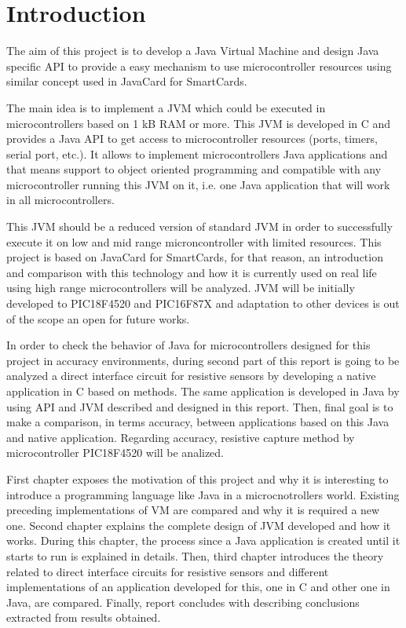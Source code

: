 \chapter{Introduction}\label{C:Introduction}
The aim of this project is to develop a Java Virtual Machine and design Java specific API to provide a easy mechanism to use microcontroller resources using similar concept used in JavaCard for SmartCards.

The main idea is to implement a JVM which could be executed in microcontrollers based on 1 kB RAM or more. This JVM is developed in C and provides a Java API to get access to microcontroller resources (ports, timers, serial port, etc.). It allows to implement microcontrollers Java applications and that means support to object oriented programming and compatible with any microcontroller running this JVM on it, i.e. one Java application that will work in all microcontrollers.

This JVM should be a reduced version of standard JVM in order to successfully execute it on low and mid range microncontroller with limited resources. This project is based on JavaCard for SmartCards, for that reason, an introduction and comparison with this technology and how it is currently used on real life using high range microcontrollers will be analyzed. JVM will be initially developed to PIC18F4520 and PIC16F87X and adaptation to other devices is out of the scope an open for future works.

In order to check the behavior of Java for microcontrollers designed for this project in accuracy environments, during second part of this report is going to be analyzed a direct interface circuit for resistive sensors by developing a native application in C based on \cite{Art:Accuracy} methods. The same application is developed in Java by using API and JVM described and designed in this report. Then, final goal is to make a comparison, in terms accuracy, between applications based on this Java and native application. Regarding accuracy, resistive capture method by microcontroller PIC18F4520  will be analized.

First chapter exposes the motivation of this project and why it is interesting to introduce a programming language like Java in a microcnotrollers world. Existing preceding implementations of VM are compared and why it is required a new one. Second chapter explains the complete design of JVM developed and how it works. During this chapter, the process since a Java application is created until it starts to run is explained in details. Then, third chapter introduces the theory related to direct interface circuits for resistive sensors and different implementations of an application developed for this, one in C and other one in Java, are compared. Finally, report concludes with describing conclusions extracted from results obtained.



